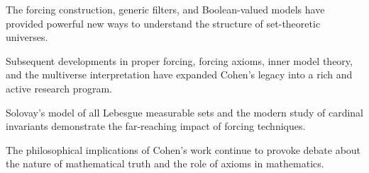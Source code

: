The forcing construction, generic filters, and Boolean-valued models have provided powerful new ways to understand the structure of set-theoretic universes.

Subsequent developments in proper forcing, forcing axioms, inner model theory, and the multiverse interpretation have expanded Cohen's legacy into a rich and active research program.

Solovay's model of all Lebesgue measurable sets and the modern study of cardinal invariants demonstrate the far-reaching impact of forcing techniques.

The philosophical implications of Cohen's work continue to provoke debate about the nature of mathematical truth and the role of axioms in mathematics.
